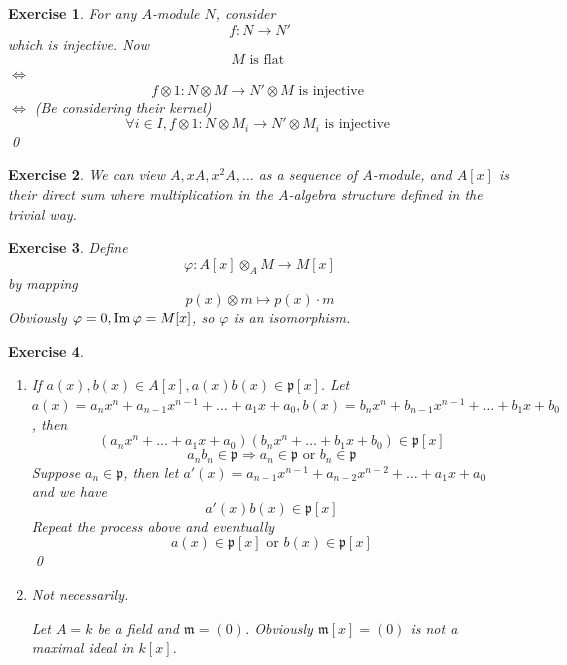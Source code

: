 \documentclass{article}
\theoremstyle{breakstyle}
\newtheorem{exercise}{Exercise}
\let\ker\relax
\DeclareMathOperator{\ker}{Ker}
\DeclareMathOperator{\im}{Im}
\begin{document}
\begin{exercise}
    For any $A$-module $N$, consider
    $$
    f:N\longrightarrow N'
    $$
    which is injective.
    Now
    $$
    M\text{ is flat }
    $$
    $\Leftrightarrow$ 
    $$
    f\otimes 1:N\otimes M\longrightarrow N'\otimes M\text{ is injective }
    $$
    $\Leftrightarrow$ (Be considering their kernel)
    $$
    \forall i\in I,f\otimes 1:N\otimes M_{i}\longrightarrow N'\otimes M_{i}\text{ is injective }
    $$
    \qed
\end{exercise}

\begin{exercise}
    We can view $A,xA,x^2A,\ldots $ as a sequence of $A$-module,
    and $A[x]$ is their direct sum where multiplication in the $A$-algebra structure defined in the trivial way.
\end{exercise}

\begin{exercise}
    Define
    $$
    \varphi:A[x]\otimes _{A}M\longrightarrow M[x]
    $$
    by mapping
    $$
    p(x)\otimes m\longmapsto p(x)\cdot m
    $$
    Obviously $\ker{\varphi}=0,\im{\varphi}=M[x]$, so $\varphi$ is an isomorphism.
\end{exercise}

\begin{exercise}
    \leavevmode \vspace{-\baselineskip}
    \begin{enumerate}[label=({\roman*})]
        \item 
            If $a(x),b(x)\in A[x],a(x)b(x)\in \mathfrak{p}[x]$.
            Let $a(x)=a_{n}x^{n}+a_{n-1}x^{n-1}+\ldots +a_1x+a_0,b(x)=b_{n}x^{n}+b_{n-1}x^{n-1}+\ldots +b_1x+b_0$,
            then
            $$
            (a_{n}x^{n}+\ldots +a_1x+a_0)(b_{n}x^{n}+\ldots +b_1x+b_0)\in \mathfrak{p}[x]
            $$
            $$
            a_{n}b_{n}\in \mathfrak{p}\Rightarrow a_{n}\in \mathfrak{p}\text{ or  }b_{n}\in \mathfrak{p}
            $$
            Suppose $a_{n}\in \mathfrak{p}$, then let $a'(x)=a_{n-1}x^{n-1}+a_{n-2}x^{n-2}+\ldots +a_1x+a_0$ and we have
            $$
            a'(x)b(x)\in \mathfrak{p}[x]
            $$
            Repeat the process above and eventually
            $$
            a(x)\in \mathfrak{p}[x]\text{ or  }b(x)\in \mathfrak{p}[x]
            $$
           \qed 
        \item Not necessarily.

            Let $A=k$ be a field and $\mathfrak{m}=(0)$.
            Obviously $\mathfrak{m}[x]=(0)$ is not a maximal ideal in $k[x]$.
    \end{enumerate}
\end{exercise}
\end{document}
